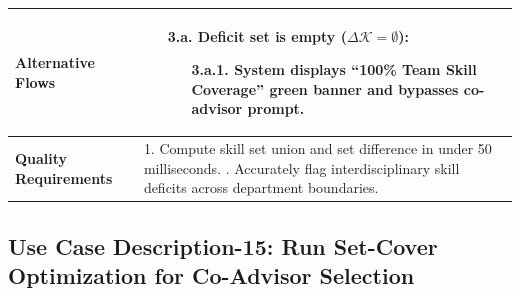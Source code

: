 \begin{table}[H]
\begin{tabularx}{\textwidth}{|l|X|}
\textbf{Alternative Flows} &
\begin{itemize}[leftmargin=*]
    \item[\textbf{3.a.}] \textbf{Deficit set is empty ($\Delta \mathcal{K} = \emptyset$):}
    \begin{itemize}[leftmargin=*]
        \item[3.a.1.] System displays ``100\% Team Skill Coverage'' green banner and bypasses co-advisor prompt.
    \end{itemize}
\end{itemize} \\ \hline
\textbf{Quality Requirements} & 
1. Compute skill set union and set difference in under 50 milliseconds. \newline
2. Accurately flag interdisciplinary skill deficits across department boundaries. \\ \hline
\end{tabularx}
\end{table}

\clearpage
\subsection{Use Case Description-15: Run Set-Cover Optimization for Co-Advisor Selection}
\label{subsec:uc15}

